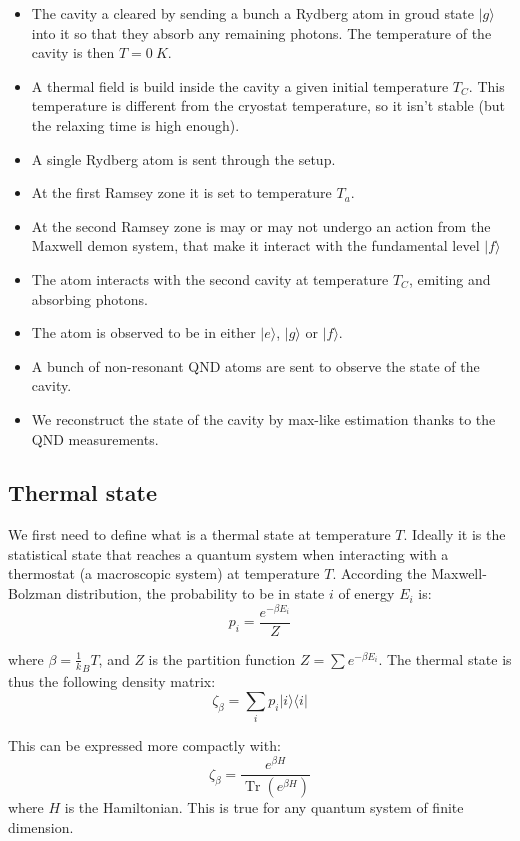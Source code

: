 \documentclass[10pt]{report}
\theoremstyle{plain}
\theoremstyle{definition}
\theoremstyle{remark}
\newcommand{\ket}[1]{|#1\rangle}
\newcommand{\bra}[1]{\langle#1|}
\DeclareMathOperator{\Tr}{Tr}
\newcommand{\trnorm}[1]{\frac{#1}{\Tr\left({#1}\right)}}
\begin{document}
\begin{itemize}
\item The cavity a cleared by sending a bunch a Rydberg atom in groud state
  $\ket g$ into it so that they absorb any remaining photons. The temperature of
  the cavity is then $T = \SI{0}{K}$.
\item A thermal field is build inside the cavity a given initial temperature
  $T_C$. This temperature is different from the cryostat temperature, so it
  isn't stable (but the relaxing time is high enough).
\item A single Rydberg atom is sent through the setup.
\item At the first Ramsey zone it is set to temperature $T_a$.
\item At the second Ramsey zone is may or may not undergo an action from the Maxwell
  demon system, that make it interact with the fundamental level $\ket f$
\item The atom interacts with the second cavity at temperature $T_C$, emiting
  and absorbing photons.
\item The atom is observed to be in either $\ket e$, $\ket g$ or $\ket f$.
\item A bunch of non-resonant QND atoms are sent to observe the state of the cavity.
\item We reconstruct the state of the cavity by max-like estimation thanks to
  the QND measurements.
\end{itemize}

\subsection{Thermal state}

We first need to define what is a thermal state at temperature $T$. Ideally it
is the statistical state that
reaches a quantum system when interacting with a thermostat
(a macroscopic system) at temperature $T$. According the Maxwell-Bolzman
distribution, the probability to be in state $i$ of energy $E_i$ is:
\[p_i = \frac {e^{-\beta E_i}} Z\]

where $\beta = \frac 1 k_B T$, and $Z$ is the partition function $Z = \sum
e^{-\beta E_i}$. The thermal state is thus the following density matrix:
\[\zeta_\beta = \sum_i p_i \ket i \bra i\]

This can be expressed more compactly with:
\begin{equation}
  \zeta_\beta = \trnorm{e^{\beta H}}
\end{equation}
where $H$ is the Hamiltonian. This is true for any quantum system of finite dimension.
\end{document}
